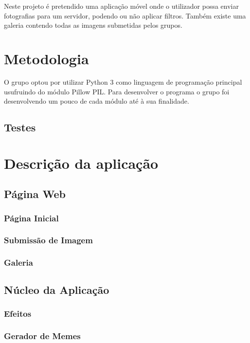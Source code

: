 \documentclass{report}
\begin{document}
Neste projeto é pretendido uma aplicação móvel onde o utilizador possa enviar fotografias para um servidor, podendo ou não aplicar filtros. Também existe uma galeria contendo todas as imagens submetidas pelos grupos.

\chapter{Metodologia}
\label{chap.metodologia}

O grupo optou por utilizar Python 3 como linguagem de programação principal usufruindo do módulo Pillow PIL. Para desenvolver o programa o grupo foi desenvolvendo um pouco de cada módulo até à sua finalidade.

\section{Testes}


\chapter{Descrição da aplicação}
\label{chap.desc}

\section{Página Web}


\subsection{Página Inicial}


\subsection{Submissão de Imagem}


\subsection{Galeria}

\section{Núcleo da Aplicação}

\subsection{Efeitos}

\subsection{Gerador de Memes}
\end{document}
